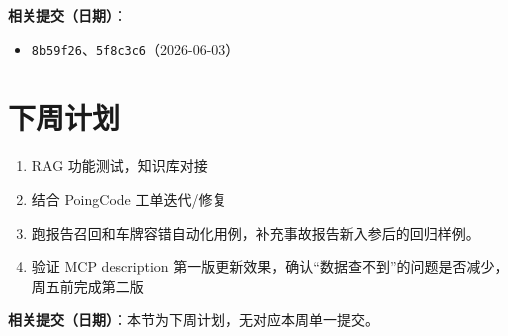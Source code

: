 \documentclass[UTF8]{ctexart}
\begin{document}
\textbf{相关提交（日期）}：
\begin{itemize}
\item \texttt{8b59f26}、\texttt{5f8c3c6}（2026-06-03）
\end{itemize}

\section{下周计划}

\begin{enumerate}
\item RAG 功能测试，知识库对接

\item 结合 PoingCode 工单迭代/修复

\item 跑报告召回和车牌容错自动化用例，补充事故报告新入参后的回归样例。

\item 验证 MCP description 第一版更新效果，确认“数据查不到”的问题是否减少，周五前完成第二版
\end{enumerate}

\textbf{相关提交（日期）}：本节为下周计划，无对应本周单一提交。
\end{document}
